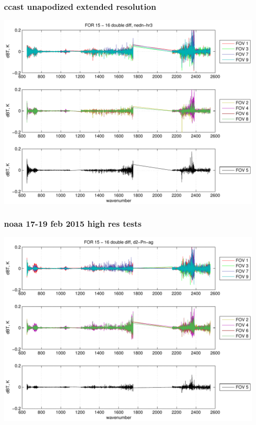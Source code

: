 \documentclass[11pt]{beamer}
\begin{document}
\begin{frame}
\frametitle{ccast unapodized extended resolution}
\begin{center}
  \includegraphics[scale=0.5]{figures/rel_ddif_e5_hr3.pdf}
\end{center}
\end{frame}
\begin{frame}
\frametitle{noaa 17-19 feb 2015 high res tests}
\begin{center}
  \includegraphics[scale=0.5]{figures/rel_noaa_ddif.pdf}
\end{center}
\end{frame}
\end{document}
